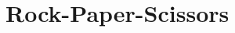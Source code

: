 \documentclass{article}
\begin{document}
\section{Rock-Paper-Scissors}

\begin{java}

\end{java}

\begin{lstlisting}

\end{lstlisting}

\javastyle

\end{document}
